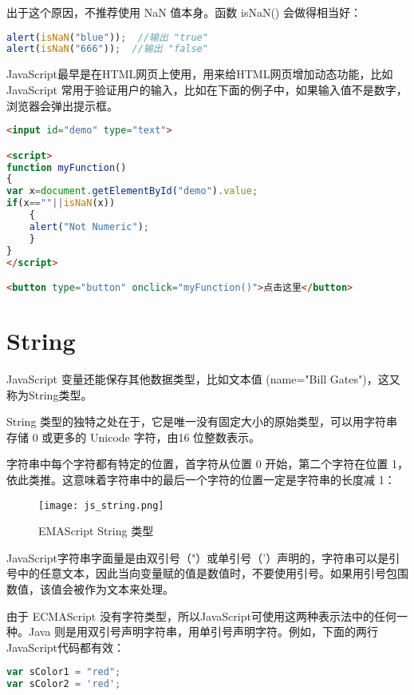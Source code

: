 出于这个原因，不推荐使用 NaN 值本身。函数 isNaN() 会做得相当好：

\begin{lstlisting}[language=JavaScript]
alert(isNaN("blue"));  //输出 "true"
alert(isNaN("666"));  //输出 "false"
\end{lstlisting}

JavaScript最早是在HTML网页上使用，用来给HTML网页增加动态功能，比如JavaScript 常用于验证用户的输入，比如在下面的例子中，如果输入值不是数字，浏览器会弹出提示框。



\begin{lstlisting}[language=HTML]
<input id="demo" type="text">

<script>
function myFunction()
{
var x=document.getElementById("demo").value;
if(x==""||isNaN(x))
	{
	alert("Not Numeric");
	}
}
</script>

<button type="button" onclick="myFunction()">点击这里</button>
\end{lstlisting}



\section{String}

JavaScript 变量还能保存其他数据类型，比如文本值 (name="Bill Gates")，这又称为String类型。

String 类型的独特之处在于，它是唯一没有固定大小的原始类型，可以用字符串存储 0 或更多的 Unicode 字符，由16 位整数表示。

字符串中每个字符都有特定的位置，首字符从位置 0 开始，第二个字符在位置 1，依此类推。这意味着字符串中的最后一个字符的位置一定是字符串的长度减 1：

\begin{figure}[!h]
\centering
\texttt{[image: js\_string.png]}
\caption{EMAScript String 类型}
\label{js_string}
\end{figure}

JavaScript字符串字面量是由双引号（"）或单引号（'）声明的，字符串可以是引号中的任意文本，因此当向变量赋的值是数值时，不要使用引号。如果用引号包围数值，该值会被作为文本来处理。

由于 ECMAScript 没有字符类型，所以JavaScript可使用这两种表示法中的任何一种。Java 则是用双引号声明字符串，用单引号声明字符。例如，下面的两行JavaScript代码都有效：


\begin{lstlisting}[language=JavaScript]
var sColor1 = "red";
var sColor2 = 'red';
\end{lstlisting}



